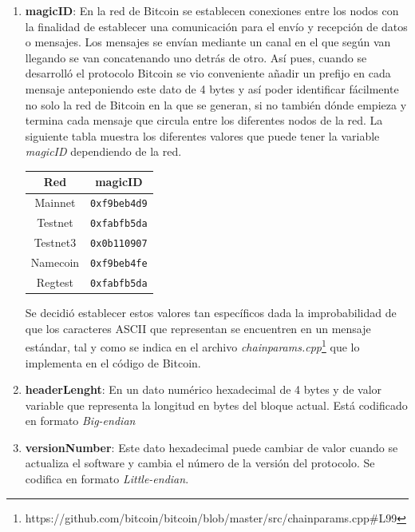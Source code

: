 \documentclass{article}
\begin{document}
    \begin{enumerate}
        \item \textbf{magicID}: En la red de Bitcoin se establecen conexiones entre los nodos con la finalidad de establecer una comunicación para el envío y recepción de datos o mensajes. Los mensajes se envían mediante un canal en el que según van llegando se van concatenando uno detrás de otro. Así pues, cuando se desarrolló el protocolo Bitcoin se vio conveniente añadir un prefijo en cada mensaje anteponiendo este dato de 4 bytes y así poder identificar fácilmente no solo la red de Bitcoin en la que se generan, si no también dónde empieza y termina cada mensaje que circula entre los diferentes nodos de la red. La siguiente tabla muestra los diferentes valores que puede tener la variable \textit{magicID} dependiendo de la red.
        
        \begin{table}[H]
        \centering
        \begin{tabular}{| c | c |} 
            \hline
            Red & magicID \\
            \hline
            Mainnet & \texttt{0xf9beb4d9} \\
            \hline
            Testnet & \texttt{0xfabfb5da} \\
            \hline
            Testnet3 & \texttt{0x0b110907} \\
            \hline
            Namecoin & \texttt{0xf9beb4fe} \\
            \hline
            Regtest & \texttt{0xfabfb5da} \\
            \hline
        \end{tabular}
        \label{table:1}
        \end{table}
        
        Se decidió establecer estos valores tan específicos dada la improbabilidad de que los caracteres ASCII que representan se encuentren en un mensaje estándar, tal y como se indica en el archivo \textit{chainparams.cpp}\footnote{https://github.com/bitcoin/bitcoin/blob/master/src/chainparams.cpp\#L99} que lo implementa en el código de Bitcoin.
    
        \item \textbf{headerLenght}: En un dato numérico hexadecimal de 4 bytes y de valor variable que representa la longitud en bytes del bloque actual. Está codificado en formato \textit{Big-endian}
        
        \item \textbf{versionNumber}: Este dato hexadecimal puede cambiar de valor cuando se actualiza el software y cambia el número de la versión del protocolo. Se codifica en formato \textit{Little-endian}.
        

\end{enumerate}
\end{document}
